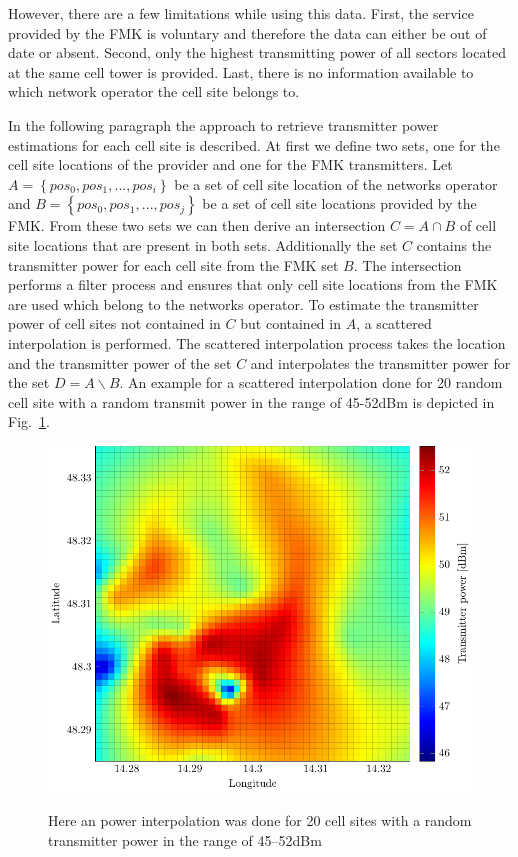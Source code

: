 However, there are a few limitations while using this data. First, the service provided by the FMK is voluntary and therefore the data can either be out of date or absent. Second, only the highest transmitting power of all sectors located at the same cell tower is provided. Last, there is no information available to which network operator the cell site belongs to.

In the following paragraph the approach to retrieve transmitter power estimations for each cell site is described. At first we define two sets, one for the cell site locations of the provider and one for the FMK transmitters.
Let $A=\left\lbrace pos_0,pos_1,...,pos_i \right\rbrace $ be a set of cell site location of the networks operator and $B=\left\lbrace pos_0,pos_1,...,pos_j \right\rbrace$ be a set of cell site locations provided by the FMK. From these two sets we can then derive an intersection $C=A \cap B$ of cell site locations that are present in both sets. Additionally the set $C$ contains the transmitter power for each cell site from the FMK set $B$. The intersection performs a filter process and ensures that only cell site locations from the FMK are used which belong to the networks operator. To estimate the transmitter power of cell sites not contained in $C$ but  contained in $A$, a scattered interpolation is performed. The scattered interpolation process takes the location and the transmitter power of the set $C$ and interpolates the transmitter power for the set $D=A \backslash B$.
An example for a scattered interpolation done for 20 random cell site with a random transmit power in the range of 45-52dBm is depicted in Fig.~\ref{fig:transmitpower}.
	\begin{figure}[h!]
		
		\caption{
		Here an power interpolation was done for 20 cell sites with a random transmitter power in the range of 45--52dBm}
		\includegraphics[width=0.9\columnwidth]{senderpower}
		\label{fig:transmitpower}
	\end{figure}
